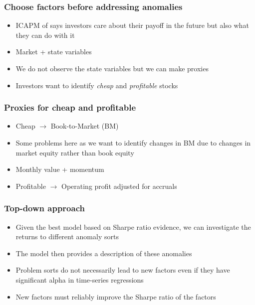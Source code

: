 \documentclass{beamer}
\begin{document}
\begin{frame}
  \frametitle{Choose factors before addressing anomalies}
  \begin{itemize}
    \item ICAPM of \textcite{merton1973intertemporal}
    says investors care about their payoff in the future but
    also what they can do with it
    \item Market + state variables
    \item We do not observe the state variables but we can make proxies
    \item Investors want to identify \emph{cheap} and \emph{profitable} stocks
  \end{itemize}
\end{frame}

\begin{frame}
\frametitle{Proxies for cheap and profitable}
\begin{itemize}
    \item Cheap $\rightarrow$ Book-to-Market (BM)
    \parencite{fama1993common}
    \item Some problems here as we want to identify changes in BM due to
    changes in market equity rather than book equity
    \item Monthly value + momentum
    \parencite{asness2013devil, kok2017facts}
    \item Profitable $\rightarrow$ Operating profit adjusted for accruals
    \parencite{ball2016accruals}
\end{itemize}
\end{frame}

\begin{frame}
  \frametitle{Top-down approach}
  \begin{itemize}
    \item Given the best model based on Sharpe ratio evidence,
    we can investigate the returns to different anomaly sorts
    \item The model then provides a description of these anomalies
    \item Problem sorts do not necessarily lead to new factors even if they
    have significant alpha in time-series regressions
    \item New factors must reliably improve the Sharpe ratio of the factors
  \end{itemize}
\end{frame}
\end{document}
